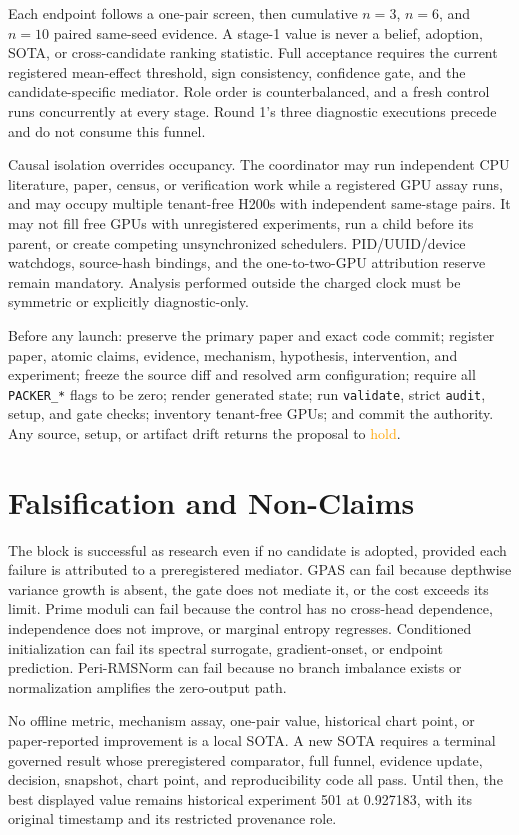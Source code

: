 \documentclass{article}
\newcommand{\holdx}{\textcolor{orange}{hold}}
\begin{document}
Each endpoint follows a one-pair screen, then cumulative $n=3$, $n=6$, and
$n=10$ paired same-seed evidence.  A stage-1 value is never a belief,
adoption, SOTA, or cross-candidate ranking statistic.  Full acceptance
requires the current registered mean-effect threshold, sign consistency,
confidence gate, and the candidate-specific mediator.  Role order is
counterbalanced, and a fresh control runs concurrently at every stage.
Round 1's three diagnostic executions precede and do not consume this funnel.

Causal isolation overrides occupancy.  The coordinator may run independent
CPU literature, paper, census, or verification work while a registered GPU
assay runs, and may occupy multiple tenant-free H200s with independent
same-stage pairs.  It may not fill free GPUs with unregistered experiments,
run a child before its parent, or create competing unsynchronized schedulers.
PID/UUID/device watchdogs, source-hash bindings, and the one-to-two-GPU
attribution reserve remain mandatory.  Analysis performed outside the
charged clock must be symmetric or explicitly diagnostic-only.

Before any launch: preserve the primary paper and exact code commit; register
paper, atomic claims, evidence, mechanism, hypothesis, intervention, and
experiment; freeze the source diff and resolved arm configuration; require
all \texttt{PACKER\_*} flags to be zero; render generated state; run
\texttt{validate}, strict \texttt{audit}, setup, and gate checks; inventory
tenant-free GPUs; and commit the authority.  Any source, setup, or artifact
drift returns the proposal to \holdx{}.

\section{Falsification and Non-Claims}

The block is successful as research even if no candidate is adopted, provided
each failure is attributed to a preregistered mediator.  GPAS can fail because
depthwise variance growth is absent, the gate does not mediate it, or the
cost exceeds its limit.  Prime moduli can fail because the control has no
cross-head dependence, independence does not improve, or marginal entropy
regresses.  Conditioned initialization can fail its spectral surrogate,
gradient-onset, or endpoint prediction.  Peri-RMSNorm can fail because no
branch imbalance exists or normalization amplifies the zero-output path.

No offline metric, mechanism assay, one-pair value, historical chart point, or
paper-reported improvement is a local SOTA.  A new SOTA requires a terminal
governed result whose preregistered comparator, full funnel, evidence update,
decision, snapshot, chart point, and reproducibility code all pass.  Until
then, the best displayed value remains historical experiment 501 at
0.927183, with its original timestamp and its restricted provenance role.
\end{document}
